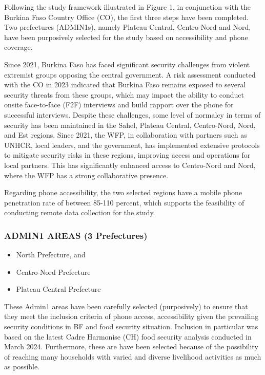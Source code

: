 \documentclass[11pt,harvard]{article}
\begin{document}
Following the study framework illustrated in Figure 1, in conjunction with the Burkina Faso Country Office (CO), the first three steps have been completed. Two prefectures (ADMIN1s), namely Plateau Central, Centro-Nord and Nord, have been purposively selected for the study based on accessibility and phone coverage.

Since 2021, Burkina Faso has faced significant security challenges from violent extremist groups opposing the central government. A risk assessment conducted with the CO in 2023 indicated that Burkina Faso remains exposed to several security threats from these groups, which may impact the ability to conduct onsite face-to-face (F2F) interviews and build rapport over the phone for successful interviews. Despite these challenges, some level of normalcy in terms of security has been maintained in the Sahel, Plateau Central, Centro-Nord, Nord, and Est regions. Since 2021, the WFP, in collaboration with partners such as UNHCR, local leaders, and the government, has implemented extensive protocols to mitigate security risks in these regions, improving access and operations for local partners. This has significantly enhanced access to Centro-Nord and Nord, where the WFP has a strong collaborative presence.

Regarding phone accessibility, the two selected regions have a mobile phone penetration rate of between 85-110 percent, which supports the feasibility of conducting remote data collection for the study.

\subsubsection{ADMIN1 AREAS (3 Prefectures)}
\begin{itemize}[left=2.0em]
	\item[1.]North Prefecture, and
	\item[2.]Centro-Nord Prefecture
	\item[3.]Plateau Central Prefecture
\end{itemize}

These Admin1 areas have been carefully selected (purposively) to ensure that they meet the inclusion criteria of phone access, accessibility given the prevailing security conditions in BF and food security situation.
Inclusion in particular was based on the latest Cadre Harmonise (CH) food security analysis conducted in March 2024. Furthermore, these are have been selected because of the possibility of reaching many households with varied and diverse livelihood activities as much as possible. 
\end{document}
